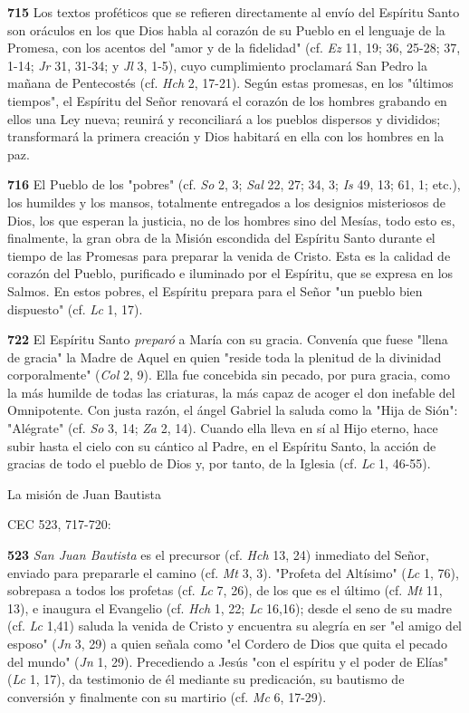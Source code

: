 \documentclass[]{article}
\begin{document}
\textbf{715} Los textos proféticos que se refieren directamente al envío
del Espíritu Santo son oráculos en los que Dios habla al corazón de su
Pueblo en el lenguaje de la Promesa, con los acentos del "amor y de la
fidelidad" (cf. \emph{Ez} 11, 19; 36, 25-28; 37, 1-14; \emph{Jr} 31,
31-34; y \emph{Jl} 3, 1-5), cuyo cumplimiento proclamará San Pedro la
mañana de Pentecostés (cf. \emph{Hch} 2, 17-21). Según estas promesas,
en los "últimos tiempos", el Espíritu del Señor renovará el corazón de
los hombres grabando en ellos una Ley nueva; reunirá y reconciliará a
los pueblos dispersos y divididos; transformará la primera creación y
Dios habitará en ella con los hombres en la paz.

\textbf{716} El Pueblo de los "pobres" (cf. \emph{So} 2, 3; \emph{Sal}
22, 27; 34, 3; \emph{Is} 49, 13; 61, 1; etc.), los humildes y los
mansos, totalmente entregados a los designios misteriosos de Dios, los
que esperan la justicia, no de los hombres sino del Mesías, todo esto
es, finalmente, la gran obra de la Misión escondida del Espíritu Santo
durante el tiempo de las Promesas para preparar la venida de Cristo.
Esta es la calidad de corazón del Pueblo, purificado e iluminado por el
Espíritu, que se expresa en los Salmos. En estos pobres, el Espíritu
prepara para el Señor "un pueblo bien dispuesto" (cf. \emph{Lc} 1, 17).

\textbf{722} El Espíritu Santo \emph{preparó} a María con su gracia.
Convenía que fuese "llena de gracia" la Madre de Aquel en quien "reside
toda la plenitud de la divinidad corporalmente" (\emph{Col} 2, 9). Ella
fue concebida sin pecado, por pura gracia, como la más humilde de todas
las criaturas, la más capaz de acoger el don inefable del Omnipotente.
Con justa razón, el ángel Gabriel la saluda como la "Hija de Sión":
"Alégrate" (cf. \emph{So} 3, 14; \emph{Za} 2, 14). Cuando ella lleva en
sí al Hijo eterno, hace subir hasta el cielo con su cántico al Padre, en
el Espíritu Santo, la acción de gracias de todo el pueblo de Dios y, por
tanto, de la Iglesia (cf. \emph{Lc} 1, 46-55).

La misión de Juan Bautista

CEC 523, 717-720:

\textbf{523} \emph{San Juan Bautista} es el precursor (cf. \emph{Hch}
13, 24) inmediato del Señor, enviado para prepararle el camino (cf.
\emph{Mt} 3, 3). "Profeta del Altísimo" (\emph{Lc} 1, 76), sobrepasa a
todos los profetas (cf. \emph{Lc} 7, 26), de los que es el último (cf.
\emph{Mt} 11, 13), e inaugura el Evangelio (cf. \emph{Hch} 1, 22;
\emph{Lc} 16,16); desde el seno de su madre (cf. \emph{Lc} 1,41) saluda
la venida de Cristo y encuentra su alegría en ser "el amigo del esposo"
(\emph{Jn} 3, 29) a quien señala como "el Cordero de Dios que quita el
pecado del mundo" (\emph{Jn} 1, 29). Precediendo a Jesús "con el
espíritu y el poder de Elías" (\emph{Lc} 1, 17), da testimonio de él
mediante su predicación, su bautismo de conversión y finalmente con su
martirio (cf. \emph{Mc} 6, 17-29).
\end{document}
